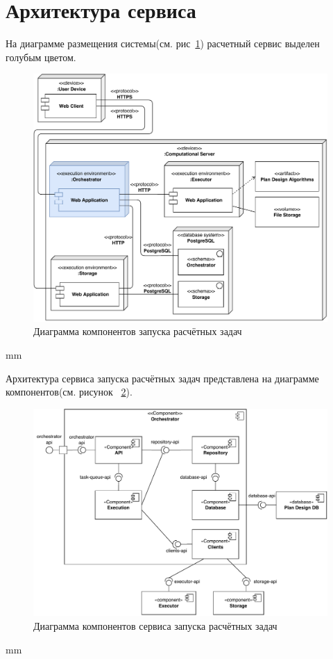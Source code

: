 \section*{\large{Архитектура сервиса}}

На диаграмме размещения системы(см. рис\ \ref{pic:architecture__deployment-diagram})
расчетный сервис выделен голубым цветом.

\begin{figure}[H]
	\includegraphics[width=\textwidth]{pictures/deployment}
	\caption{Диаграмма компонентов запуска расчётных задач}
	\label{pic:architecture__deployment-diagram}
\end{figure}
 mm


Архитектура сервиса запуска расчётных задач представлена на диаграмме
компонентов(см. рисунок \ \ref{pic:architecture__orchestrator-component}).

\begin{figure}[H]
	\includegraphics[width=\textwidth]{pictures/component_common}
	\caption{Диаграмма компонентов сервиса запуска расчётных задач}
	\label{pic:architecture__orchestrator-component}
\end{figure}
 mm

